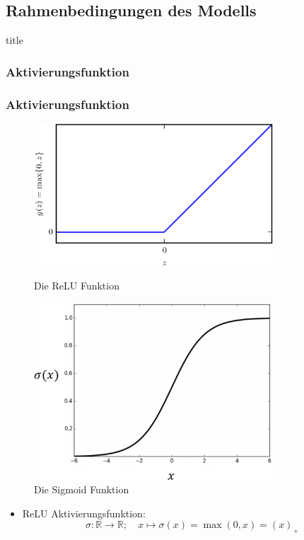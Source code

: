 \documentclass[hyperref={pdfpagelabels=false}]{beamer}
\begin{document}
\subsection{Rahmenbedingungen des Modells}
\begin{frame}
\begin{beamercolorbox}[sep=8pt,center,shadow=true,rounded=true]{title}
    \insertsubsectionhead\par
\end{beamercolorbox}
\end{frame}

\subsubsection{Aktivierungsfunktion}
\begin{frame}
\frametitle{Aktivierungsfunktion}
\begin{figure}[h] %
\begin{minipage}[t]{.45\linewidth}
\includegraphics[width=0.8\textwidth]{Bilder/ReLU.png}
\caption[Caption for LOF]{Die ReLU Funktion}
\end{minipage}\hfill
\begin{minipage}[t]{.45\linewidth}
\includegraphics[width=0.8\textwidth]{Bilder/Sigmoid.jpg}
\caption[Caption for LOF]{Die Sigmoid Funktion}
\end{minipage}
\end{figure} 
\begin{itemize}
\item ReLU Aktivierungsfunktion: 
\begin{equation*}
\sigma: \mathbb{R} \to \mathbb{R};\quad  x \mapsto \sigma(x) = \max(0,x)  = (x)_+ 
\end{equation*}
\end{itemize}
\end{frame}
\end{document}
